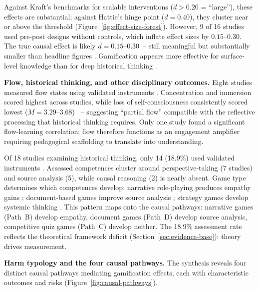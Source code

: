 

Against Kraft's \cite{Kraft2020} benchmarks for scalable interventions ($d > 0.20$ = ``large''), these effects are substantial; against Hattie's \cite{Hattie2009} hinge point ($d = 0.40$), they cluster near or above the threshold (Figure~\ref{fig:effect-size-forest}). However, 9 of 16 studies used pre-post designs without controls, which inflate effect sizes by $0.15$--$0.30$. The true causal effect is likely $d = 0.15$--$0.30$~-- still meaningful but substantially smaller than headline figures \cite{BaiHewHuang2020, SailerHomner2020}. Gamification appears more effective for surface-level knowledge than for deep historical thinking \cite{Clark2016, Connolly2012}.

\textbf{Flow, historical thinking, and other disciplinary outcomes.}
Eight studies measured flow states using validated instruments \cite{16Chen201447, 19Chou2019, 28Chao201734, 44Shiue2016, 45Yu2015727, 70Hou201519, 64Hsu201324, 67Lin201296}. Concentration and immersion scored highest across studies, while loss of self-consciousness consistently scored lowest ($M = 3.29$--$3.68$) \cite{63Liu2021, 64Hsu201324, 16Chen201447}~-- suggesting ``partial flow'' \cite{16Chen201447} compatible with the reflective processing that historical thinking requires. Only one study \cite{45Yu2015727} found a significant flow-learning correlation; flow therefore functions as an engagement amplifier requiring pedagogical scaffolding to translate into understanding.

Of 18 studies examining historical thinking, only 14 (18.9\%) used validated instruments \cite{MonteSano2012, Reisman2012, Seixas2013}. Assessed competences cluster around perspective-taking (7 studies) and source analysis (5), while causal reasoning (2) is nearly absent. Game type determines which competences develop: narrative role-playing produces empathy gains \cite{12Gilbert2019108, 78Rouse2022357, 56Akkerman2009449}; document-based games improve source analysis \cite{59Kee2014270, 60Hoy2018}; strategy games develop systemic thinking \cite{55Squire2004, 40Kuran2018}. This pattern maps onto the causal pathways: narrative games (Path~B) develop empathy, document games (Path~D) develop source analysis, competitive quiz games (Path~C) develop neither. The 18.9\% assessment rate reflects the theoretical framework deficit (Section~\ref{sec:evidence-base}): theory drives measurement.

\textbf{Harm typology and the four causal pathways.} \label{sec:harm-typology}
The synthesis reveals four distinct causal pathways mediating gamification effects, each with characteristic outcomes and risks (Figure~\ref{fig:causal-pathways}).

